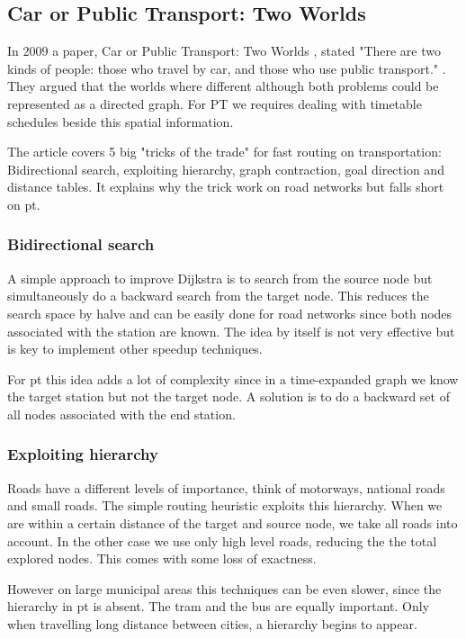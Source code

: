 \subsection{Car or Public Transport: Two Worlds}
In 2009 a paper, Car or Public Transport: Two Worlds \cite{bast_car_2009}, stated "There are two kinds of people: those who travel by car, and those who use public transport." . They argued that the worlds where different although both problems could be represented as a directed graph. For PT we requires dealing with timetable schedules beside this spatial information.

The article covers 5 big "tricks of the trade" for fast routing on transportation: Bidirectional search, exploiting hierarchy, graph contraction, goal direction and distance tables. It explains why the trick work on road networks but falls short on \acrshort{pt}.

\subsubsection{Bidirectional search}
A simple approach to improve Dijkstra is to search from the source node but simultaneously do a backward search from the target node. This reduces the search space by halve and can be easily done for road networks since both nodes associated with the station are known. The idea by itself is not very effective but is key to implement other speedup techniques.

For \acrshort{pt} this idea adds a lot of complexity since in a time-expanded graph we know the target station but not the target node. A solution is to do a backward set of all nodes associated with the end station.
\subsubsection{Exploiting hierarchy}
Roads have a different levels of importance, think of motorways, national roads and small roads. The simple routing heuristic exploits this hierarchy. When we are within a certain distance of the target and source node, we take all roads into account. In the other case we use only high level roads, reducing the the total explored nodes. This comes with some loss of exactness.

However on large municipal areas this techniques can be even slower, since the hierarchy in \acrshort{pt} is absent. The tram and the bus are equally important. Only when travelling long distance between cities, a hierarchy begins to appear. 
